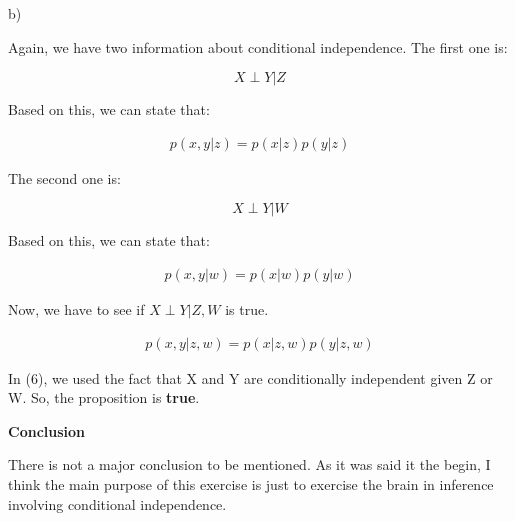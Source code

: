 \documentclass[a4paper,10pt]{book}
\begin{document}
b)

Again, we have two information about conditional independence. The first one is:

\[X \perp Y | Z\]

Based on this, we can state that:

\begin{equation}
\begin{split}
p(x, y | z) = p(x|z)p(y|z)
\end{split}
\end{equation}

The second one is:

\[X \perp Y | W\]

Based on this, we can state that:

\begin{equation}
\begin{split}
p(x, y | w) = p(x|w)p(y|w)
\end{split}
\end{equation}

Now, we have to see if $X \perp Y | Z, W$ is true.

\begin{equation}
\begin{split}
p(x,y|z,w) = p(x|z,w)p(y|z,w)
\end{split}
\end{equation}

In (6), we used the fact that X and Y are conditionally independent given Z or W.
So, the proposition is \textbf{true}.\par






\textbf{Conclusion} \par
There is not a major conclusion to be mentioned. As it was said it the begin, I think the main
purpose of this exercise is just to exercise the brain in inference involving conditional independence.
\end{document}
